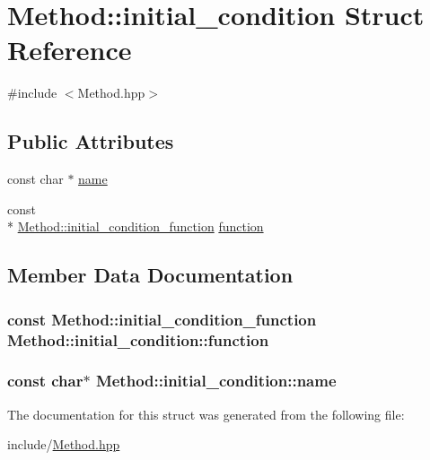 \hypertarget{structMethod_1_1initial__condition}{\section{Method\-:\-:initial\-\_\-condition Struct Reference}
\label{structMethod_1_1initial__condition}
}


{\ttfamily \#include $<$Method.\-hpp$>$}

\subsection*{Public Attributes}
\begin{DoxyCompactItemize}
\item 
const char $\ast$ \hyperlink{structMethod_1_1initial__condition_ae4d83030eafaee7da11e58e1e97e6e39}{name}
\item 
const \\*
\hyperlink{classMethod_aa5f32411bc120712a9b4e780f593ccf0}{Method\-::initial\-\_\-condition\-\_\-function} \hyperlink{structMethod_1_1initial__condition_ab1a391d4d32f7af358f4cf44f4eee55d}{function}
\end{DoxyCompactItemize}


\subsection{Member Data Documentation}
\hypertarget{structMethod_1_1initial__condition_ab1a391d4d32f7af358f4cf44f4eee55d}{
\subsubsection[{function}]{\setlength{\rightskip}{0pt plus 5cm}const {\bf Method\-::initial\-\_\-condition\-\_\-function} Method\-::initial\-\_\-condition\-::function}}\label{structMethod_1_1initial__condition_ab1a391d4d32f7af358f4cf44f4eee55d}
\hypertarget{structMethod_1_1initial__condition_ae4d83030eafaee7da11e58e1e97e6e39}{
\subsubsection[{name}]{\setlength{\rightskip}{0pt plus 5cm}const char$\ast$ Method\-::initial\-\_\-condition\-::name}}\label{structMethod_1_1initial__condition_ae4d83030eafaee7da11e58e1e97e6e39}


The documentation for this struct was generated from the following file\-:\begin{DoxyCompactItemize}
\item 
include/\hyperlink{Method_8hpp}{Method.\-hpp}\end{DoxyCompactItemize}
